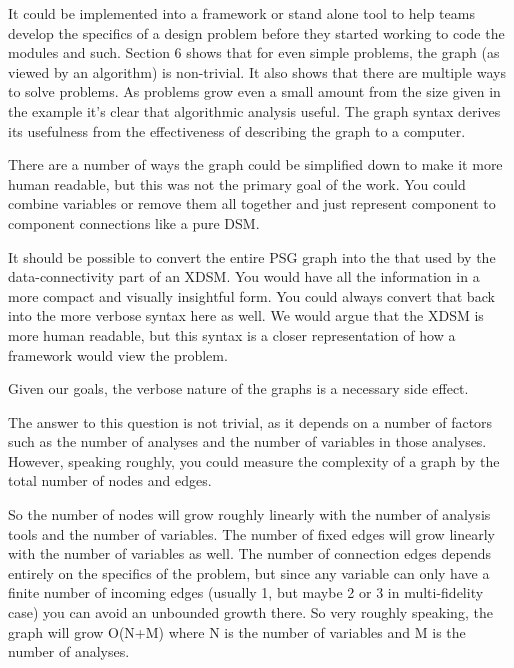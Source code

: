 \documentclass{aiaa-tc}
\begin{document}
It could be implemented into a framework or stand alone tool to help teams develop the
specifics of a design problem before they started working to code the modules and such. 
Section 6 shows that for even simple problems, the graph (as viewed by an algorithm) is 
non-trivial. It also shows that there are multiple ways to solve problems. As 
problems grow even a small amount from the size given in the example it's clear that 
algorithmic analysis useful. The graph syntax derives its usefulness from 
the effectiveness of describing the graph to a computer. 


There are a number of ways the graph could be simplified down to make it more 
human readable, but this was not the primary goal of the work. You could combine 
variables or remove them all together and just represent component to component 
connections like a pure DSM. 

It should be possible to convert the entire PSG graph into the that used by the 
data-connectivity part of an XDSM. You would have all the information in a more 
compact and visually insightful form. You could always convert that back into the 
more verbose syntax here as well. We would argue that the XDSM is more human readable, 
but this syntax is a closer representation of how a framework would view the problem. 

Given our goals, the verbose nature of the graphs is a necessary side effect. 


The answer to this question is not trivial, as it depends on a number of factors 
such as the number of analyses and the number of variables in those analyses. 
However, speaking roughly, you could measure the complexity of a graph by the total 
number of nodes and edges. 

So the number of nodes will grow roughly linearly with the number of analysis tools 
and the number of variables. The number of fixed edges will grow linearly with the number of variables as well. The number of connection edges depends entirely on the specifics of the problem, but since any variable can only have a finite number of incoming edges (usually 1, but maybe 2 or 3 in multi-fidelity case) you can avoid an unbounded 
growth there. So very roughly speaking, the graph will grow O(N+M) where N is the number 
of variables and M is the number of analyses. 
\end{document}
